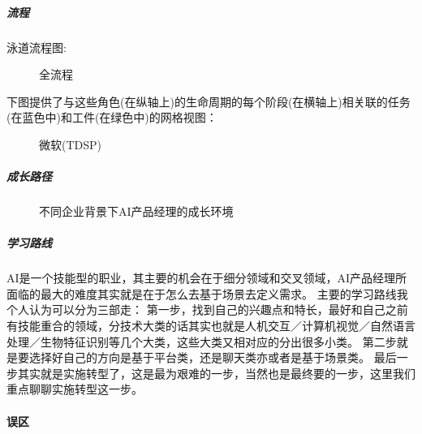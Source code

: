 \documentclass[letterpaper,11pt,english]{sphinxmanual}
\begin{document}
\subparagraph{流程}
\label{\detokenize{chapter_introduction/AI_PM:id19}}
泳道流程图:

\begin{figure}[H]
\centering
\capstart

\noindent{}
\caption{全流程}\label{\detokenize{chapter_introduction/AI_PM:id38}}\end{figure}

下图提供了与这些角色(在纵轴上)的生命周期的每个阶段(在横轴上)相关联的任务(在蓝色中)和工件(在绿色中)的网格视图：

\begin{figure}[H]
\centering
\capstart

\noindent{}
\caption{微软(TDSP)}\label{\detokenize{chapter_introduction/AI_PM:id39}}\end{figure}


\subparagraph{成长路径}
\label{\detokenize{chapter_introduction/AI_PM:id20}}
\begin{figure}[H]
\centering
\capstart

\noindent{}
\caption{不同企业背景下AI产品经理的成长环境\sphinxfootnotemark[96]}\label{\detokenize{chapter_introduction/AI_PM:id40}}\end{figure}
%
\begin{footnotetext}[96]\sphinxAtStartFootnote
{}
%
\end{footnotetext}\ignorespaces 

\subparagraph{学习路线}
\label{\detokenize{chapter_introduction/AI_PM:id21}}
AI是一个技能型的职业，其主要的机会在于细分领域和交叉领域，AI产品经理所面临的最大的难度其实就是在于怎么去基于场景去定义需求。
主要的学习路线我个人认为可以分为三部走：
第一步，找到自己的兴趣点和特长，最好和自己之前有技能重合的领域，分技术大类的话其实也就是人机交互／计算机视觉／自然语言处理／生物特征识别等几个大类，这些大类又相对应的分出很多小类。
第二步就是要选择好自己的方向是基于平台类，还是聊天类亦或者是基于场景类。
最后一步其实就是实施转型了，这是最为艰难的一步，当然也是最终要的一步，这里我们重点聊聊实施转型这一步。


\paragraph{误区}
\label{\detokenize{chapter_introduction/AI_PM:id22}}
\end{document}
